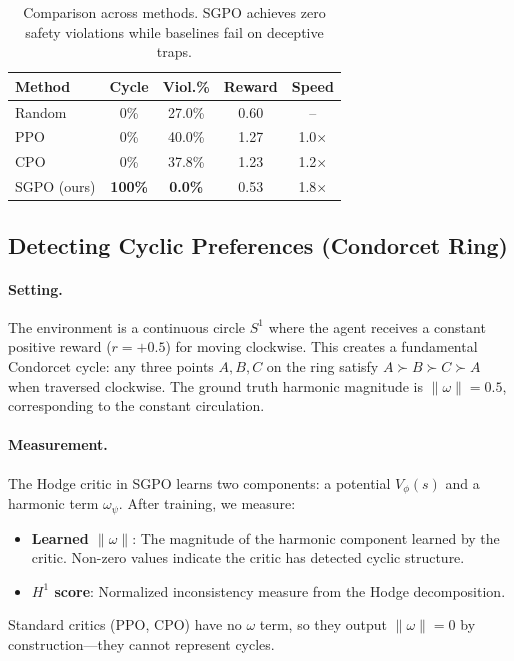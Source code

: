 \begin{table}[t]
\caption{Comparison across methods. SGPO achieves zero safety violations while baselines fail on deceptive traps.}
\label{tab:main_results}
\centering
\small
\begin{tabular}{@{}lcccc@{}}
\toprule
\textbf{Method} & \textbf{Cycle} & \textbf{Viol.\%} & \textbf{Reward} & \textbf{Speed} \\
\midrule
Random & 0\% & 27.0\% & 0.60 & -- \\
PPO & 0\% & 40.0\% & 1.27 & 1.0$\times$ \\
CPO & 0\% & 37.8\% & 1.23 & 1.2$\times$ \\
SGPO (ours) & \textbf{100\%} & \textbf{0.0\%} & 0.53 & 1.8$\times$ \\
\bottomrule
\end{tabular}
\end{table}

\subsection{Detecting Cyclic Preferences (Condorcet Ring)}

\paragraph{Setting.} The environment is a continuous circle $S^1$ where the agent receives a constant positive reward ($r = +0.5$) for moving clockwise. This creates a fundamental Condorcet cycle: any three points $A, B, C$ on the ring satisfy $A \succ B \succ C \succ A$ when traversed clockwise. The ground truth harmonic magnitude is $\|\omega\| = 0.5$, corresponding to the constant circulation.

\paragraph{Measurement.} The Hodge critic in SGPO learns two components: a potential $V_\phi(s)$ and a harmonic term $\omega_\psi$. After training, we measure:
\begin{itemize}
    \item \textbf{Learned $\|\omega\|$}: The magnitude of the harmonic component learned by the critic. Non-zero values indicate the critic has detected cyclic structure.
    \item \textbf{$H^1$ score}: Normalized inconsistency measure from the Hodge decomposition.
\end{itemize}
Standard critics (PPO, CPO) have no $\omega$ term, so they output $\|\omega\| = 0$ by construction---they cannot represent cycles.

